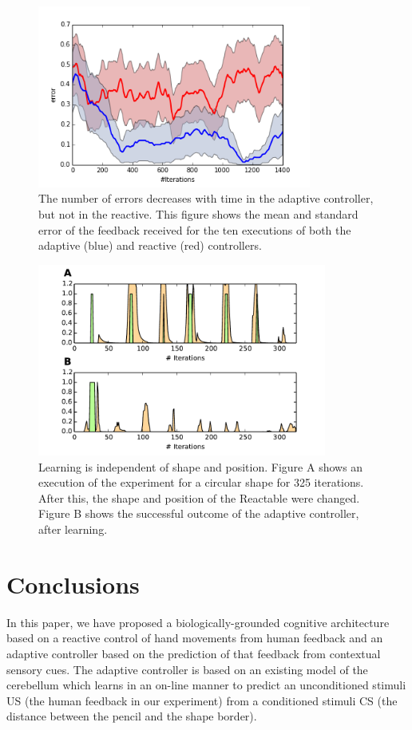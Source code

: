 \documentclass[letterpaper, 10 pt, conference]{ieeeconf}  %
\begin{document}
\begin{figure}
\centering
\includegraphics[width=9cm]{error}
\caption{The number of errors decreases with time in the adaptive controller, but not in the reactive. This figure shows the mean and standard error of the feedback received for the ten executions of both the adaptive (blue) and reactive (red) controllers. }
\label{fig:error}
\end{figure}

\begin{figure}
\centering
\includegraphics[width=9.5cm]{general}
\caption{Learning is independent of shape and position. Figure A shows an execution of the experiment for a circular shape for 325 iterations. After this, the shape and position of the Reactable were changed. Figure B shows the successful outcome of the adaptive controller, after learning. }
\label{fig:general}
\end{figure}

\section{Conclusions}
\label{seq:conclusions}

In this paper, we have proposed a biologically-grounded cognitive architecture based on a reactive control of hand movements from human feedback and an adaptive controller based on the prediction of that feedback from contextual sensory cues. The adaptive controller is based on an existing model of the cerebellum which learns in an on-line manner to predict an unconditioned stimuli US (the human feedback in our experiment) from a conditioned stimuli CS (the distance between the pencil and the shape border). 
\end{document}
